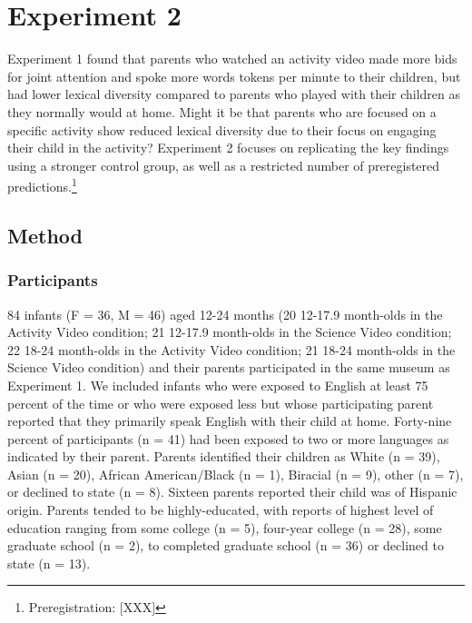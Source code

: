 \documentclass[
  english,
  man]{apa6}
\begin{document}
\hypertarget{experiment-2}{%
\section{Experiment 2}\label{experiment-2}}

Experiment 1 found that parents who watched an activity video made more bids for joint attention and spoke more words tokens per minute to their children, but had lower lexical diversity compared to parents who played with their children as they normally would at home.
Might it be that parents who are focused on a specific activity show reduced lexical diversity due to their focus on engaging their child in the activity?
Experiment 2 focuses on replicating the key findings using a stronger control group, as well as a restricted number of preregistered predictions.\footnote{Preregistration: {[}XXX{]}}

\hypertarget{method-1}{%
\subsection{Method}\label{method-1}}

\hypertarget{participants-1}{%
\subsubsection{Participants}\label{participants-1}}

84 infants (F = 36, M = 46) aged 12-24 months
(20 12-17.9 month-olds in the Activity Video condition;
21 12-17.9 month-olds in the Science Video condition;
22 18-24 month-olds in the Activity Video condition;
21 18-24 month-olds in the Science Video condition) and their parents participated in the same museum as Experiment 1.
We included infants who were exposed to English at least 75 percent of the time or who were exposed less but whose participating parent reported that they primarily speak English with their child at home.
Forty-nine percent of participants (n = 41) had been exposed to two or more languages as indicated by their parent.
Parents identified their children as White (n = 39), Asian (n = 20), African American/Black (n = 1), Biracial (n = 9), other (n = 7), or declined to state (n = 8).
Sixteen parents reported their child was of Hispanic origin.
Parents tended to be highly-educated, with reports of highest level of education ranging from some college (n = 5), four-year college (n = 28), some graduate school (n = 2), to completed graduate school (n = 36) or declined to state (n = 13).
\end{document}
